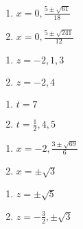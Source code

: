\begin{multicols}{2}
\begin{enumerate}
\setcounter{enumi}{\value{HW}}

\item  $x = 0, \frac{5\pm \sqrt{61}}{18}$
\item  $x = 0, \frac{5 \pm \sqrt{241}}{12}$

\setcounter{HW}{\value{enumi}}
\end{enumerate}
\end{multicols}

\begin{multicols}{2}
\begin{enumerate}
\setcounter{enumi}{\value{HW}}

\item $z = -2,1,3$
\item $z=-2,4$

\setcounter{HW}{\value{enumi}}
\end{enumerate}
\end{multicols}


\begin{multicols}{2}
\begin{enumerate}
\setcounter{enumi}{\value{HW}}

\item $t=7$
\item $t = \frac{1}{2}, 4, 5$

\setcounter{HW}{\value{enumi}}
\end{enumerate}
\end{multicols}

\begin{multicols}{2}
\begin{enumerate}
\setcounter{enumi}{\value{HW}}

\item $x = -2, \frac{3 \pm \sqrt{69}}{6}$

\item $x = \pm \sqrt{3}$


\setcounter{HW}{\value{enumi}}
\end{enumerate}
\end{multicols}

\begin{multicols}{2}
\begin{enumerate}
\setcounter{enumi}{\value{HW}}

\item $z = \pm \sqrt{5}$

\item $z = -\frac{3}{2}, \pm \sqrt{3}$

\setcounter{HW}{\value{enumi}}
\end{enumerate}
\end{multicols}



